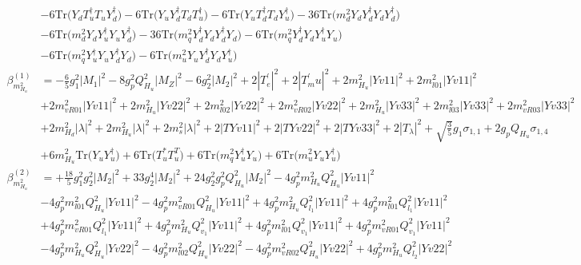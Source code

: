 \begin{align}
 &-6 \mbox{Tr}\Big({Y_d  T_{u}^{\dagger}  T_u  Y_{d}^{\dagger}}\Big) -6 \mbox{Tr}\Big({Y_u  Y_{d}^{\dagger}  T_d  T_{u}^{\dagger}}\Big) -6 \mbox{Tr}\Big({Y_u  T_{d}^{\dagger}  T_d  Y_{u}^{\dagger}}\Big) -36 \mbox{Tr}\Big({m_d^2  Y_d  Y_{d}^{\dagger}  Y_d  Y_{d}^{\dagger}}\Big) \nonumber \\ 
 &-6 \mbox{Tr}\Big({m_d^2  Y_d  Y_{u}^{\dagger}  Y_u  Y_{d}^{\dagger}}\Big) -36 \mbox{Tr}\Big({m_q^2  Y_{d}^{\dagger}  Y_d  Y_{d}^{\dagger}  Y_d}\Big) -6 \mbox{Tr}\Big({m_q^2  Y_{d}^{\dagger}  Y_d  Y_{u}^{\dagger}  Y_u}\Big) \nonumber \\ 
 &-6 \mbox{Tr}\Big({m_q^2  Y_{u}^{\dagger}  Y_u  Y_{d}^{\dagger}  Y_d}\Big) -6 \mbox{Tr}\Big({m_u^2  Y_u  Y_{d}^{\dagger}  Y_d  Y_{u}^{\dagger}}\Big) \\ 
\beta_{m_{H_u}^2}^{(1)} & =  
-\frac{6}{5} g_{1}^{2} |M_1|^2 -8 g_{p}^{2} Q_{H_u}^{2} |M_Z|^2 -6 g_{2}^{2} |M_2|^2 +2 |T^{\prime}_e|^2 +2 |T^{\prime}_mu|^2 +2 m_{H_u}^2 |Yv11|^2 +2 m^2_{l01} |Yv11|^2 \nonumber \\ 
 &+2 m^2_{vR01} |Yv11|^2 +2 m_{H_u}^2 |Yv22|^2 +2 m^2_{l02} |Yv22|^2 +2 m^2_{vR02} |Yv22|^2 +2 m_{H_u}^2 |Yv33|^2 +2 m^2_{l03} |Yv33|^2 +2 m^2_{vR03} |Yv33|^2 \nonumber \\ 
 &+2 m_{H_d}^2 |\lambda|^2 +2 m_{H_u}^2 |\lambda|^2 +2 m^2_{s} |\lambda|^2 +2 |TYv11|^2 +2 |TYv22|^2 +2 |TYv33|^2 +2 |T_{\lambda}|^2 +\sqrt{\frac{3}{5}} g_1 \sigma_{1,1} +2 g_p Q_{H_u} \sigma_{1,4} \nonumber \\ 
 &+6 m_{H_u}^2 \mbox{Tr}\Big({Y_u  Y_{u}^{\dagger}}\Big) +6 \mbox{Tr}\Big({T_u^*  T_{u}^{T}}\Big) +6 \mbox{Tr}\Big({m_q^2  Y_{u}^{\dagger}  Y_u}\Big) +6 \mbox{Tr}\Big({m_u^2  Y_u  Y_{u}^{\dagger}}\Big) \\ 
\beta_{m_{H_u}^2}^{(2)} & =  
+\frac{18}{5} g_{1}^{2} g_{2}^{2} |M_2|^2 +33 g_{2}^{4} |M_2|^2 +24 g_{2}^{2} g_{p}^{2} Q_{H_u}^{2} |M_2|^2 -4 g_{p}^{2} m_{H_u}^2 Q_{H_u}^{2} |Yv11|^2 \nonumber \\ 
 &-4 g_{p}^{2} m^2_{l01} Q_{H_u}^{2} |Yv11|^2 -4 g_{p}^{2} m^2_{vR01} Q_{H_u}^{2} |Yv11|^2 +4 g_{p}^{2} m_{H_u}^2 Q_{l_1}^{2} |Yv11|^2 +4 g_{p}^{2} m^2_{l01} Q_{l_1}^{2} |Yv11|^2 \nonumber \\ 
 &+4 g_{p}^{2} m^2_{vR01} Q_{l_1}^{2} |Yv11|^2 +4 g_{p}^{2} m_{H_u}^2 Q_{v_1}^{2} |Yv11|^2 +4 g_{p}^{2} m^2_{l01} Q_{v_1}^{2} |Yv11|^2 +4 g_{p}^{2} m^2_{vR01} Q_{v_1}^{2} |Yv11|^2 \nonumber \\ 
 &-4 g_{p}^{2} m_{H_u}^2 Q_{H_u}^{2} |Yv22|^2 -4 g_{p}^{2} m^2_{l02} Q_{H_u}^{2} |Yv22|^2 -4 g_{p}^{2} m^2_{vR02} Q_{H_u}^{2} |Yv22|^2 +4 g_{p}^{2} m_{H_u}^2 Q_{l_2}^{2} |Yv22|^2 \nonumber \\ 

\end{align}
